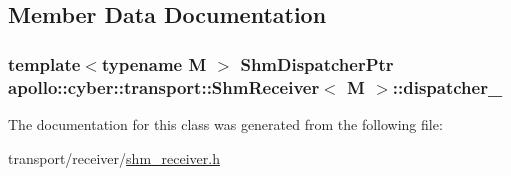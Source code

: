 \subsection{Member Data Documentation}
\hypertarget{classapollo_1_1cyber_1_1transport_1_1ShmReceiver_abf3042d9d3eac73989c591b7980d07f5}{
\subsubsection[{dispatcher\-\_\-}]{\setlength{\rightskip}{0pt plus 5cm}template$<$typename M $>$ {\bf Shm\-Dispatcher\-Ptr} {\bf apollo\-::cyber\-::transport\-::\-Shm\-Receiver}$<$ M $>$\-::dispatcher\-\_\-\hspace{0.3cm}{\ttfamily [private]}}}\label{classapollo_1_1cyber_1_1transport_1_1ShmReceiver_abf3042d9d3eac73989c591b7980d07f5}


The documentation for this class was generated from the following file\-:\begin{DoxyCompactItemize}
\item 
transport/receiver/\hyperlink{shm__receiver_8h}{shm\-\_\-receiver.\-h}\end{DoxyCompactItemize}
